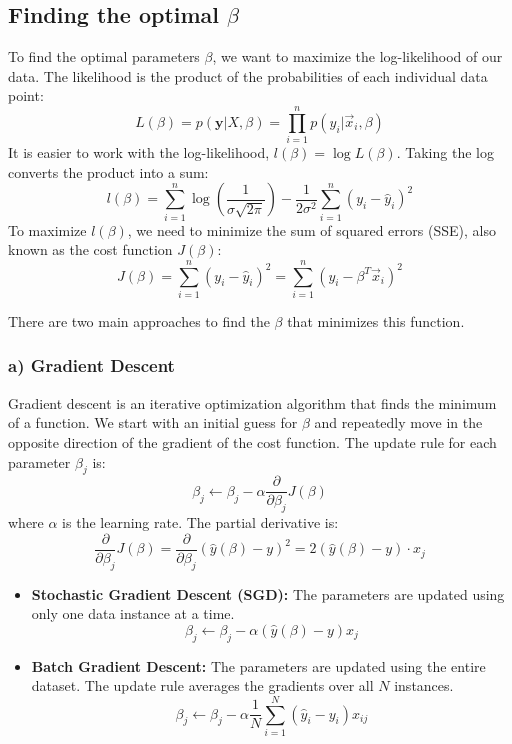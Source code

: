\documentclass{article}
\begin{document}
\begin{multicols}{2}
\subsection{Finding the optimal $\beta$}
To find the optimal parameters $\beta$, we want to maximize the log-likelihood of our data. The likelihood is the product of the probabilities of each individual data point:
$$ L(\beta) = p(\mathbf{y}|X, \beta) = \prod_{i=1}^{n} p(y_i | \vec{x}_i, \beta) $$
It is easier to work with the log-likelihood, $l(\beta) = \log L(\beta)$. Taking the log converts the product into a sum:
$$ l(\beta) = \sum_{i=1}^{n} \log\left(\frac{1}{\sigma\sqrt{2\pi}}\right) - \frac{1}{2\sigma^2} \sum_{i=1}^{n} (y_i - \hat{y}_i)^2 $$
To maximize $l(\beta)$, we need to minimize the sum of squared errors (SSE), also known as the cost function $J(\beta)$:
$$ J(\beta) = \sum_{i=1}^{n} (y_i - \hat{y}_i)^2 = \sum_{i=1}^{n} (y_i - \beta^T \vec{x}_i)^2 $$

There are two main approaches to find the $\beta$ that minimizes this function.

\subsubsection{a) Gradient Descent}
Gradient descent is an iterative optimization algorithm that finds the minimum of a function. We start with an initial guess for $\beta$ and repeatedly move in the opposite direction of the gradient of the cost function. The update rule for each parameter $\beta_j$ is:
$$ \beta_j \leftarrow \beta_j - \alpha \frac{\partial}{\partial \beta_j} J(\beta) $$
where $\alpha$ is the learning rate. The partial derivative is:
$$ \frac{\partial}{\partial \beta_j} J(\beta) = \frac{\partial}{\partial \beta_j} (\hat{y}(\beta) - y)^2 =  2(\hat{y}(\beta) - y) \cdot x_j $$
\begin{itemize}
    \item \textbf{Stochastic Gradient Descent (SGD):} The parameters are updated using only one data instance at a time.
    $$ \beta_j \leftarrow \beta_j - \alpha (\hat{y}(\beta) - y) x_j $$
    \item \textbf{Batch Gradient Descent:} The parameters are updated using the entire dataset. The update rule averages the gradients over all $N$ instances.
    $$ \beta_j \leftarrow \beta_j - \alpha \frac{1}{N} \sum_{i=1}^{N} (\hat{y}_i - y_i) x_{ij} $$
\end{itemize}


\end{multicols}
\end{document}
